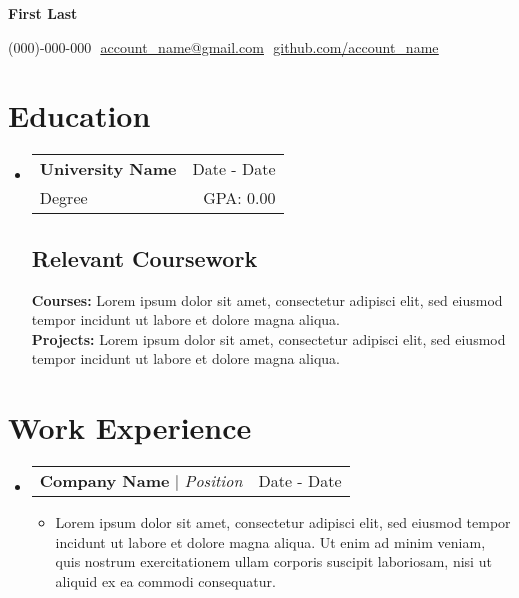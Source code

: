 \documentclass[letterpaper,12pt]{article}
\makeatletter
\newcommand{\resumeItem}[1]{
  \item\small{
    {#1 \vspace{-2pt}}
  }
}
\newcommand{\resumeSubheading}[4]{
  \vspace{-2pt}\item
    \begin{tabular*}{0.97\textwidth}[t]{l@{\extracolsep{\fill}}r}
      \textbf{#1} & #2 \\
      {\small#3} & {\small #4} \\
    \end{tabular*}\vspace{-7pt}
}
\newcommand{\resumeProjectHeading}[2]{
    \item
    \begin{tabular*}{0.97\textwidth}{l@{\extracolsep{\fill}}r}
      \small#1 & #2 \\
    \end{tabular*}\vspace{-7pt}
}
\newcommand{\resumeSubHeadingListStart}{\begin{itemize}[leftmargin=0.15in, label={}]}
\newcommand{\resumeSubHeadingListEnd}{\end{itemize}}
\newcommand{\resumeItemListStart}{\begin{itemize}}
\newcommand{\resumeItemListEnd}{\end{itemize}\vspace{-5pt}}
\makeatother
\begin{document}

\begin{center}
    \textbf{\Huge First Last} \\ \vspace{8pt}

    \small
    (000)-000-000 $  $
    \href{mailto:account_name@gmail.com}
    {\underline{account\_name@gmail.com}} $  $
    \href{https://github.com/account_name}
    {\underline{github.com/account\_name}}

\end{center}

\section{Education}
\resumeSubHeadingListStart

\resumeSubheading
{University Name}{Date - Date}
{Degree}{GPA: 0.00}

\subsection{Relevant Coursework}

\textbf{Courses:} Lorem ipsum dolor sit amet, consectetur adipisci elit, sed eiusmod tempor incidunt ut labore et dolore magna aliqua.  \\

\textbf{Projects:} Lorem ipsum dolor sit amet, consectetur adipisci elit, sed eiusmod tempor incidunt ut labore et dolore magna aliqua.
\resumeSubHeadingListEnd

\section{Work Experience}
\resumeSubHeadingListStart

\resumeProjectHeading
{\textbf{Company Name} $|$ \footnotesize\emph{Position}}{Date - Date}
\resumeItemListStart
\resumeItem{Lorem ipsum dolor sit amet, consectetur adipisci elit, sed eiusmod tempor incidunt ut labore et dolore magna aliqua. Ut enim ad minim veniam, quis nostrum exercitationem ullam corporis suscipit laboriosam, nisi ut aliquid ex ea commodi consequatur.}
\resumeItemListEnd

\resumeSubHeadingListEnd

\end{document}
